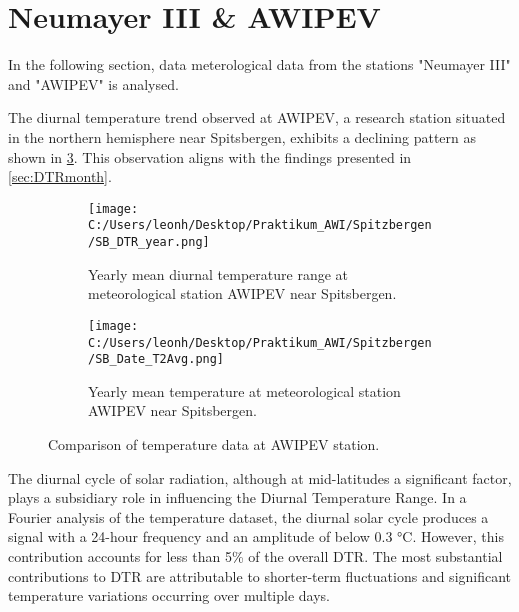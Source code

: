 \clearpage

\section{Neumayer III \& AWIPEV}

In the following section, data meterological data from the stations "Neumayer III" and "AWIPEV" is analysed.


The diurnal temperature trend observed at AWIPEV, a research station situated in the northern hemisphere near Spitsbergen, exhibits a declining pattern as shown in \cref{fig:AWIPEVcomparison}. This observation aligns with the findings presented in \cref*{sec:DTRmonth}.
\begin{figure}[ht]
    \centering

    \begin{subfigure}[t]{0.48\textwidth}
        \texttt{[image: C:/Users/leonh/Desktop/Praktikum\_AWI/Spitzbergen/SB\_DTR\_year.png]}
        \caption{Yearly mean diurnal temperature range at meteorological station AWIPEV near Spitsbergen.}
        \label{fig:DTRyearAWIPEV}
    \end{subfigure}
    \hfill
    \begin{subfigure}[t]{0.48\textwidth}
        \texttt{[image: C:/Users/leonh/Desktop/Praktikum\_AWI/Spitzbergen/SB\_Date\_T2Avg.png]}
        \caption{Yearly mean temperature at meteorological station AWIPEV near Spitsbergen.}
        \label{fig:TAvgyearAWIPEV}
    \end{subfigure}
    \caption{Comparison of temperature data at AWIPEV station.}
    \label{fig:AWIPEVcomparison}
\end{figure}

The diurnal cycle of solar radiation, although at mid-latitudes a significant factor, plays a subsidiary role in influencing the Diurnal Temperature Range.
In a Fourier analysis of the temperature dataset, the diurnal solar cycle produces a signal with a 24-hour frequency and an amplitude of below 0.3 °C.
However, this contribution accounts for less than 5\% of the overall DTR. The most substantial contributions to DTR are attributable to shorter-term fluctuations and
significant temperature variations occurring over multiple days.

